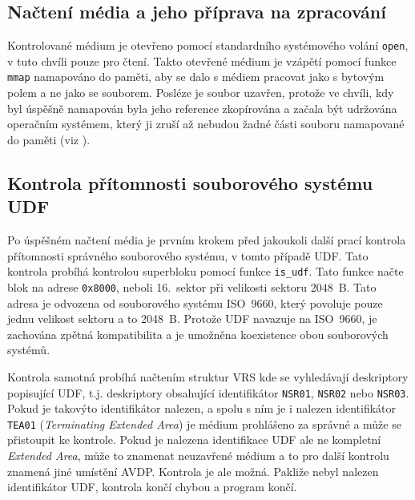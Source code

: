 \subsection{Načtení média a jeho příprava na zpracování}
Kontrolované médium je otevřeno pomocí standardního systémového volání \texttt{open}, v tuto chvíli pouze pro čtení. Takto otevřené médium je vzápětí pomocí funkce \texttt{mmap} namapováno do paměti, aby se dalo s médiem pracovat jako s bytovým polem a ne jako se souborem. Posléze je soubor uzavřen, protože ve chvíli, kdy byl úspěšně namapován byla jeho reference zkopírována a začala být udržována operačním systémem, který ji zruší až nebudou žadné části souboru namapované do paměti (viz \cite{posix-mmap}). 

\subsection{Kontrola přítomnosti souborového systému UDF}
Po úspěšném načtení média je prvním krokem před jakoukoli další prací kontrola přítomnosti správného souborového systému, v tomto případě UDF. Tato kontrola probíhá kontrolou superbloku pomocí funkce \texttt{is\_udf}. Tato funkce načte blok na adrese \texttt{0x8000}, neboli 16.~sektor při velikosti sektoru 2048~B. Tato adresa je odvozena od souborového systému ISO~9660, který povoluje pouze jednu velikost sektoru a to 2048~B. Protože UDF navazuje na ISO~9660, je zachována zpětná kompatibilita a je umožněna koexistence obou souborových systémů.

Kontrola samotná probíhá načtením struktur VRS kde se vyhledávají deskriptory popisující UDF, t.j. deskriptory obsahující identifikátor \texttt{NSR01}, \texttt{NSR02} nebo \texttt{NSR03}. Pokud je takovýto identifikátor nalezen, a spolu s ním je i nalezen identifikátor \texttt{TEA01} (\textit{Terminating Extended Area}) je médium prohlášeno za správné a může se přistoupit ke kontrole. Pokud je nalezena identifikace UDF ale ne kompletní \textit{Extended Area}, může to znamenat neuzavřené médium a to pro další kontrolu znamená jiné umístění AVDP. Kontrola je ale možná. Pakliže nebyl nalezen identifikátor UDF, kontrola končí chybou a program končí.

